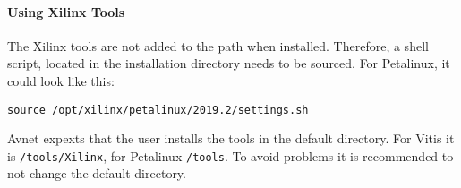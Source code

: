 \paragraph{Using Xilinx Tools}
The Xilinx tools are not added to the path when installed.
Therefore, a shell script, located in the installation directory needs to be sourced.
For Petalinux, it could look like this:
\begin{lstlisting}[style=bash, caption={}, label=lst:source_tools]
  source /opt/xilinx/petalinux/2019.2/settings.sh
\end{lstlisting}
Avnet expexts that the user installs the tools in the default directory.
For Vitis it is \texttt{/tools/Xilinx}, for Petalinux \texttt{/tools}.
To avoid problems it is recommended to not change the default directory.

